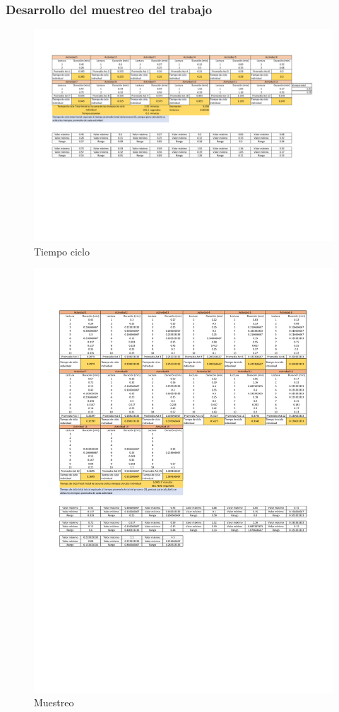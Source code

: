     \subsubsection{Desarrollo del muestreo del trabajo}
    \begin{figure}[H]
        \centering
        \includegraphics[scale=0.25]{13/img/tiempoCicloEnsamble.pdf}
        \caption{Tiempo ciclo}
        \label{fig:Tiempo ciclo}
    \end{figure}
    \begin{figure}[H]
        \centering
        \includegraphics[scale=0.25]{13/img/tiempoCicloEnsambleDos.pdf}
        \caption{Muestreo}
        \label{fig:Muestreo}
    \end{figure}
